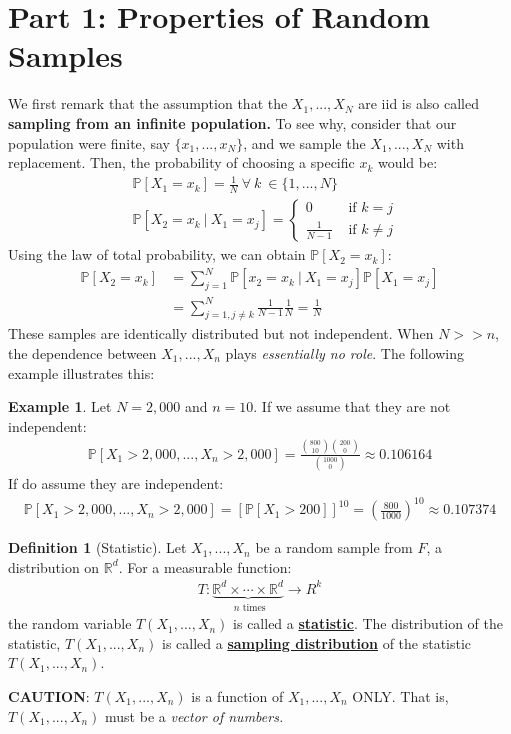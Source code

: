 \documentclass[11pt]{scrartcl}
\newcommand{\R}[0]{\mathbb{R}}
\theoremstyle{definition}
\newtheorem{definition}{Definition}
\newtheorem{ex}{Example}
\theoremstyle{remark}
\newcommand{\dfn}[1]{\textbf{\underline{#1}}}
\newcommand{\pr}[1]{\mathbb{P}[#1]}
\newcommand{\stat}[0]{T(X_1, ..., X_n )}
\begin{document}
\section{Part 1: Properties of Random Samples}

We first remark that the assumption that the $X_1, ..., X_N$ are iid is also called \textbf{sampling from an infinite population.} To see why, consider that our population were finite, say $\{ x_1, ..., x_N \}$, and we sample the $X_1,..., X_N$ with replacement. Then, the probability of choosing a specific $x_k$ would be: 
\begin{align*}
		& \pr{ X_1 = x_k } = \frac{1}{N}\ \forall\ k\ \in \{ 1, ..., N \} \\
		& \pr{ X_2 = x_k\ |\ X_1 = x_j } = \begin{cases}
			0 & \text{ if } k = j \\
			\frac{1}{N-1} & \text{ if } k \neq j 
		\end{cases} 
\end{align*}
Using the law of total probability, we can obtain $\pr{X_2 = x_k}$: 
\begin{align*}
	\pr{X_2 = x_k } & = \sum_{j=1}^N \pr{x_2 = x_k\ |\ X_1 = x_j } \pr{X_1 = x_j} \\
		& = \sum_{j=1, j \neq k}^N \frac{1}{N-1	} \frac{1}{N} = \frac{1}{N}
\end{align*}
These samples are identically distributed but not independent. When $N >> n $, the dependence between $X_1, ..., X_n$ plays \emph{essentially no role}. The following example illustrates this: 

\begin{ex} 
Let $N=2,000$ and $n=10$. If we assume that they are not independent: 
\begin{align*}
\pr{X_1 > 2,000 , ... , X_n > 2,000}  =	\frac{\binom{800}{10} \binom{200}{0}}{\binom{1000}{0}} \approx 0.106164 
\end{align*}
If do assume they are independent: 
\begin{align*}
\pr{X_1 > 2,000 , ... , X_n > 2,000} = [\pr{X_1 > 200}]^{10} =  \left( \frac{800}{1000} \right)^{10} \approx 0.107374 	
\end{align*}
\end{ex}

\begin{definition}[Statistic]
	Let $X_1, ..., X_n$ be a random sample from $F$, a distribution on $\R^d$. For a measurable function: 
	\begin{align}
		T: \underbrace{\R^d \times \cdots \times \R^d}_{\text{ $n$ times } } \rightarrow R^k 
	\end{align}
	the random variable $T(X_1, ..., X_n)$ is called a \dfn{statistic}. The distribution of the statistic, $T(X_1,...,X_n)$ is called a \dfn{sampling distribution} of the statistic $\stat$. 
\end{definition}
\textbf{CAUTION}: $\stat$ is a function of $X_1, ..., X_n$ ONLY. That is, $\stat$ must be a \emph{vector of numbers.} 
\end{document}

